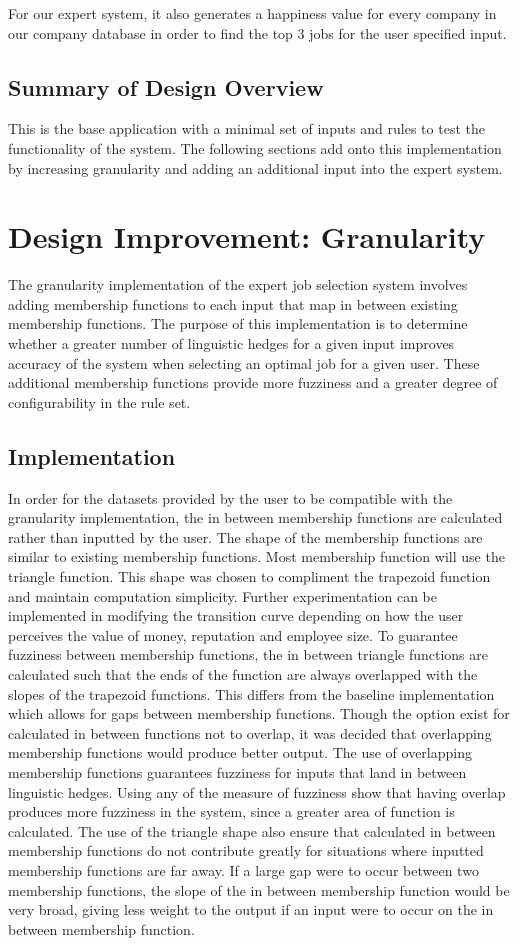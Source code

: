 \documentclass[12pt,fleqn,reqno,letterpaper]{article}
\begin{document}
For our expert system, it also generates a happiness value for every company in our company database in order to find the top 3 jobs for the user specified input.

\subsection{Summary of Design Overview}
This is the base application with a minimal set of inputs and rules to test the functionality of the system. The following sections add onto this implementation by increasing granularity and adding an additional input into the expert system.

\section{Design Improvement: Granularity}
The granularity implementation of the expert job selection system involves adding membership functions to each input that map in between existing membership functions.  The purpose of this implementation is to determine whether a greater number of linguistic hedges for a given input improves accuracy of the system when selecting an optimal job for a given user.  These additional membership functions provide more fuzziness and a greater degree of configurability in the rule set.

\subsection{Implementation}
In order for the datasets provided by the user to be compatible with the granularity implementation, the in between membership functions are calculated rather than inputted by the user.  The shape of the membership functions are similar to existing membership functions.  Most membership function will use the triangle function.  This shape was chosen to compliment the trapezoid function and maintain computation simplicity.  Further experimentation can be implemented in modifying the transition curve depending on how the user perceives the value of money, reputation and employee size.  To guarantee fuzziness between membership functions, the in between triangle functions are calculated such that the ends of the function are always overlapped with the slopes of the trapezoid functions.  This differs from the baseline implementation which allows for gaps between membership functions.  Though the option exist for calculated in between functions not to overlap, it was decided that overlapping membership functions would produce better output.  The use of overlapping membership functions guarantees fuzziness for inputs that land in between linguistic hedges.  Using any of the measure of fuzziness show that having overlap produces more fuzziness in the system, since a greater area of function is calculated.  The use of the triangle shape also ensure that calculated in between membership functions do not contribute greatly for situations where inputted membership functions are far away.  If a large gap were to occur between two membership functions, the slope of the in between membership function would be very broad, giving less weight to the output if an input were to occur on the in between membership function.
\end{document}
